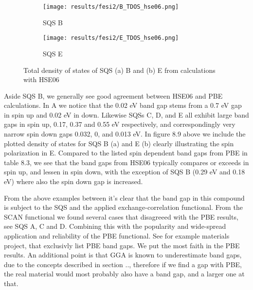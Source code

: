 \begin{figure}[H]
	\centering	
	\begin{subfigure}{.8\textwidth}
		\texttt{[image: results/fesi2/B\_TDOS\_hse06.png]}
		\caption{SQS B}
	\end{subfigure}
	\begin{subfigure}{.8\textwidth}
		\texttt{[image: results/fesi2/E\_TDOS\_hse06.png]}
		\caption{SQS E}
	\end{subfigure}
	\caption{Total density of states of SQS (a) B and  (b) E from calculations with HSE06}
\end{figure}

Aside SQS B, we generally see good agreement between HSE06 and PBE calculations. In A we notice that the 0.02 eV band gap stems from a 0.7 eV gap in spin up and 0.02 eV in down. Likewise SQSs C, D, and E all exhibit large band gaps in spin up, 0.17, 0.37 and 0.55 eV respectively, and correspondingly very narrow spin down gaps 0.032, 0, and 0.013 eV. In figure 8.9 above we include the plotted density of states for SQS B (a) and E (b) clearly illustrating the spin polarization in E. Compared to the listed spin dependent band gaps from PBE in table 8.3, we see that the band gaps from HSE06 typically compares or exceeds in spin up, and lessen in spin down, with the exception of SQS B (0.29 eV and 0.18 eV) where also the spin down gap is increased. 

From the above examples between it's clear that the band gap in this compound is subject to the SQS and the applied exchange-correlation functional. From the SCAN functional we found several cases that disagreeed with the PBE results, see SQS A, C and D. Combining this with the popularity and wide-spread application and reliability of the PBE functional. See for example materials project, that exclusivly list PBE band gaps. We put the most faith in the PBE results. An additional point is that GGA is known to underestimate band gaps, due to the concepts described in section .., therefore if we find a gap with PBE, the real material would most probably also have a band gap, and a larger one at that.

